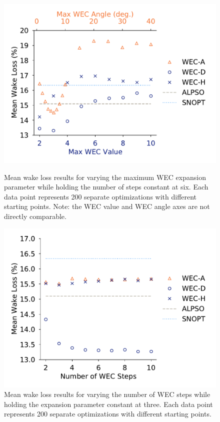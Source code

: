 \documentclass{jpconf}
\begin{document}
\begin{figure}[ht]
	\centering
	\begin{minipage}[t]{0.47\textwidth}
		\centering
		\includegraphics[width=\textwidth, trim={0cm 0cm 0cm 0cm}, clip]{tests/maxwec_const_nsteps6_mean}
		\caption{Mean wake loss results for varying the maximum WEC expansion parameter while holding the number of steps constant at six. Each data point represents 200 separate optimizations with different starting points. Note: the WEC value and WEC angle axes are not directly comparable.}
		\label{fig:aepmean-wm}
	\end{minipage}\hspace{1pc}
	\begin{minipage}[t]{0.47\textwidth}
		\centering
		\includegraphics[width=\textwidth]{tests/nsteps_const_maxwec_mean}
		\caption{Mean wake loss results for varying the number of WEC steps while holding the expansion parameter constant at three. Each data point represents 200 separate optimizations with different starting points.}
		\label{fig:aepmean-ws}
	\end{minipage}
\end{figure}
\end{document}
